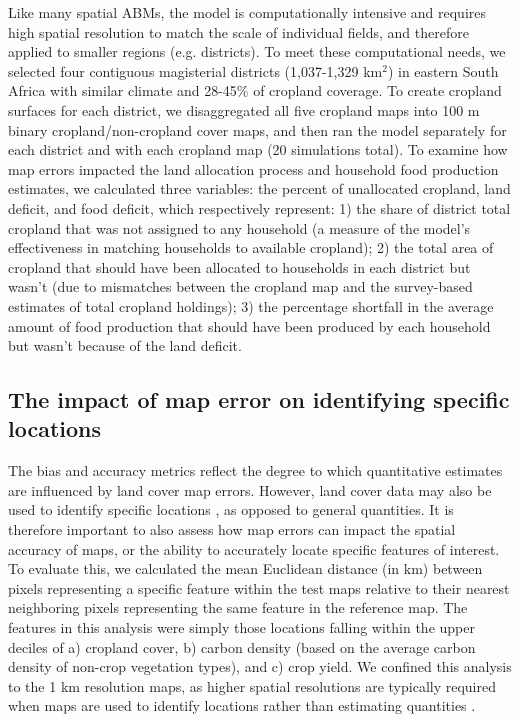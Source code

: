 \documentclass[12 pt, titlepage, a4paper]{article}
\begin{document}
Like many spatial ABMs, the model is computationally intensive and requires high spatial resolution to match the scale of individual fields, and therefore applied to smaller regions (e.g. districts). To meet these computational needs, we selected four contiguous magisterial districts (1,037-1,329 km$^2$) in eastern South Africa with similar climate and 28-45\% of cropland coverage. To create cropland surfaces for each district, we disaggregated all five cropland maps into 100 m binary cropland/non-cropland cover maps, and then ran the model separately for each district and with each cropland map (20 simulations total). To examine how map errors impacted the land allocation process and household food production estimates, we calculated three variables: the percent of unallocated cropland, land deficit, and food deficit, which respectively represent: 1) the share of district total cropland that was not assigned to any household (a measure of the model's effectiveness in matching households to available cropland); 2) the total area of cropland that should have been allocated to households in each district but wasn't (due to mismatches between the cropland map and the survey-based estimates of total cropland holdings); 3) the percentage shortfall in the average amount of food production that should have been produced by each household but wasn't because of the land deficit. 

\vspace{-0.3 cm}
\subsection*{The impact of map error on identifying specific locations}
\vspace{-0.2 cm}
The bias and accuracy metrics reflect the degree to which quantitative estimates are influenced by land cover map errors. However, land cover data may also be used to identify specific locations \citep[e.g. areas of high agricultural potential and low ecological cost;][]{estes_reconciling_2016}, as opposed to general quantities. It is therefore important to also assess how map errors can impact the spatial accuracy of maps, or the ability to accurately locate specific features of interest. To evaluate this, we calculated the mean Euclidean distance (in km) between pixels representing a specific feature within the test maps relative to their nearest neighboring pixels representing the same feature in the reference map. The features in this analysis were simply those locations falling within the upper deciles of a) cropland cover, b) carbon density (based on the average carbon density of non-crop vegetation types), and c) crop yield. We confined this analysis to the 1 km resolution maps, as higher spatial resolutions are typically required when maps are used to identify locations rather than estimating quantities \citep[e.g.][]{estes_reconciling_2016}.  
\end{document}
